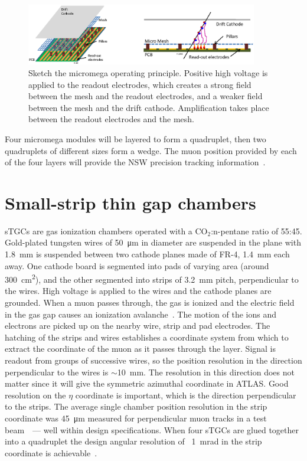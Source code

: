 \begin{figure}
    \centering
    \includegraphics[width = 0.9\textwidth]{figures/micromegas.png}
    \caption{Sketch the micromega operating principle. Positive high voltage is applied to the readout electrodes, which creates a strong field between the mesh and the readout electrodes, and a weaker field between the mesh and the drift cathode. Amplification takes place between the readout electrodes and the mesh. }
    \label{fig:micromega}
\end{figure}

Four micromega modules will be layered to form a quadruplet, then two quadruplets of different sizes form a wedge. The muon position provided by each of the four layers will provide the NSW precision tracking information~\cite{nsw_tdr}.

\section{Small-strip thin gap chambers}

sTGCs are gas ionization chambers operated with a CO$_2$:n-pentane ratio of 55:45. Gold-plated tungsten wires of \SI{50}{\micro\meter} in diameter are suspended in the plane with \SI{1.8}{mm} is suspended between two cathode planes made of FR-4, \SI{1.4}{mm} each away. One cathode board is segmented into pads of varying area (around \SI{300}{cm^2}), and the other segmented into strips of \SI{3.2}{mm} pitch, perpendicular to the wires. High voltage is applied to the wires and the cathode planes are grounded. When a muon passes through, the gas is ionized and the electric field in the gas gap causes an ionization avalanche~\cite{townsend_electricity_1915}. The motion of the ions and electrons are picked up on the nearby wire, strip and pad electrodes. The hatching of the strips and wires establishes a coordinate system from which to extract the coordinate of the muon as it passes through the layer. Signal is readout from groups of successive wires, so the position resolution in the direction perpendicular to the wires is $\sim$\SI{10}{mm}. The resolution in this direction does not matter since it will give the symmetric azimuthal coordinate in ATLAS. Good resolution on the $\eta$ coordinate is important, which is the direction perpendicular to the strips. The average single chamber position resolution in the strip coordinate was \SI{45}{\micro\meter} measured for perpendicular muon tracks in a test beam~\cite{abusleme_performance_2016}~--- well within design specifications. When four sTGCs are glued together into a quadruplet the design angular resolution of ~\SI{1}{mrad} in the strip coordinate is achievable~\cite{nsw_tdr, perez-codina_small-strip_2016}.

